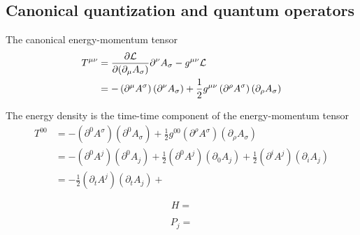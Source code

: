 


\subsection{Canonical quantization and quantum operators}

The canonical energy-momentum tensor~\cite[p.~174]{Greiner2013}
\begin{equation}
	\begin{split}
		T^{\mu\nu}
		&=
		\pdv{\mathcal{L}}{(\partial_\mu A_\sigma)}
		\partial^\nu A_\sigma
		-
		g^{\mu\nu}\mathcal{L}
		\\
		&=
		-
		\left(
			\partial^\mu
			A^\sigma
		\right)
		\left(
			\partial^\nu
			A_\sigma
		\right)
		+
		\frac{1}{2}
		g^{\mu\nu}
		\left(
			\partial^\rho
			A^\sigma
		\right)
		\left(
			\partial_\rho
			A_\sigma
		\right)
	\end{split}
\end{equation}

The energy density is the time-time component of the energy-momentum tensor
\begin{equation}
	\begin{split}
		T^{00}
		&=
		-
		\left(
			\partial^0
			A^\sigma
		\right)
		\left(
			\partial^0
			A_\sigma
		\right)
		+
		\frac{1}{2}
		g^{00}
		\left(
			\partial^\rho
			A^\sigma
		\right)
		\left(
			\partial_\rho
			A_\sigma
		\right)
		\\
		&=
		-
		\left(
			\partial^0
			A^j
		\right)
		\left(
			\partial^0
			A_j
		\right)
		+
		\frac{1}{2}
		\left(
			\partial^0
			A^j
		\right)
		\left(
			\partial_0
			A_j
		\right)
		+
		\frac{1}{2}
		\left(
			\partial^i
			A^j
		\right)
		\left(
			\partial_i
			A_j
		\right)
		\\
		&=
		-
		\frac{1}{2}
		\left(
			\partial_t
			A^j
		\right)
		\left(
			\partial_t
			A_j
		\right)
		+
	\end{split}
\end{equation}

\begin{equation}
	H
	=
\end{equation}

\begin{equation}
	P_j
	=
\end{equation}

